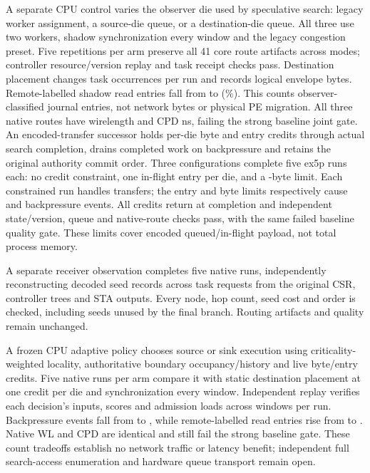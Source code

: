 \documentclass[10pt]{article}
\begin{document}
A separate CPU control varies the observer die used by speculative search:
legacy worker assignment, a source-die queue, or a destination-die queue.
All three use two workers, shadow synchronization every window and the
legacy congestion preset. Five repetitions per arm preserve all 41 core
route artifacts across modes; controller resource/version replay and task
receipt checks pass. Destination placement changes
\StaticMovedOccurrences{} task occurrences per run and records
\StaticLogicalMovedBytes{} logical envelope bytes. Remote-labelled shadow
read entries fall from \StaticSourceRemoteReads{} to
\StaticDestinationRemoteReads{} (\StaticRemoteReduction{}\%). This counts
observer-classified journal entries, not network bytes or physical PE
migration. All three native routes have wirelength \StaticPlacementWL{}
and CPD \StaticPlacementCPD{} ns, failing the strong baseline joint gate.
An encoded-transfer successor holds per-die byte and entry credits through
actual search completion, drains completed work on backpressure and
retains the original authority commit order. Three configurations complete
five ex5p runs each: no credit constraint, one in-flight entry per die, and
a \CreditByteLimit{}-byte limit. Each constrained run handles
\CreditNativeTasks{} transfers; the entry and byte limits respectively
cause \CreditEntryStalls{} and \CreditByteStalls{} backpressure events.
All credits return at completion and independent state/version, queue and
native-route checks pass, with the same failed baseline quality gate.
These limits cover encoded queued/in-flight payload, not total process memory.

A separate receiver observation completes five native runs, independently
reconstructing \ReceivedNativeSeeds{} decoded seed records across
\ReceivedNativeRequests{} task requests from the original CSR, controller
trees and STA outputs. Every node, hop count, seed cost and order is
checked, including seeds unused by the final branch. Routing artifacts
and quality remain unchanged.

A frozen CPU adaptive policy chooses source or sink execution using
criticality-weighted locality, authoritative boundary occupancy/history
and live byte/entry credits. Five native runs per arm compare it with
static destination placement at one credit per die and synchronization
every window. Independent replay verifies each decision's inputs, scores
and admission loads across \AdaptiveNativeWindows{} windows per run.
Backpressure events fall from \CreditEntryStalls{} to
\AdaptiveNativeBackpressure{}, while remote-labelled read entries rise
from \StaticDestinationRemoteReads{} to \AdaptiveNativeRemote{}.
Native WL and CPD are identical and still fail the strong baseline gate.
These count tradeoffs establish no network traffic or latency benefit;
independent full search-access enumeration and hardware queue transport
remain open.
\end{document}
